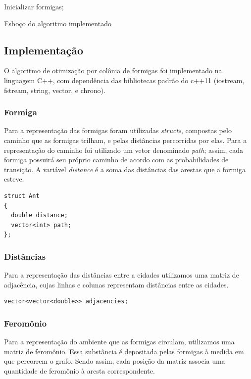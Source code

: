 \documentclass[a4paper, 12pt]{article}
\begin{document}
\begin{algorithm}[h]
\SetAlgoLined
{}

Inicializar formigas; \\
\caption{Esboço do algoritmo implementado}
\label{alg:algoritmo1}
\end{algorithm}
\setlength{\parskip}{0.0cm}


\subsection{Implementação}
O algoritmo de otimização por colônia de formigas foi implementado na linguagem C++, com dependência das bibliotecas padrão do c++11 (iostream, fstream, string, vector, e chrono). 


\subsubsection{Formiga}
Para a representação das formigas foram utilizadas \textit{structs}, compostas pelo caminho que as formigas trilham, e pelas distâncias percorridas por elas. Para a representação do caminho foi utilizado um vetor denominado \textit{path}; assim, cada formiga possuirá seu próprio caminho de acordo com as probabilidades de transição. A variável \textit{distance} é a soma das distâncias das arestas que a formiga esteve.

\begin{lstlisting}
struct Ant
{
  double distance;
  vector<int> path;
};
\end{lstlisting}

\subsubsection{Distâncias}
Para a representação das distâncias entre a cidades utilizamos uma matriz de adjacência, cujas linhas e colunas representam distâncias entre as cidades.
\begin{lstlisting}
vector<vector<double>> adjacencies;
\end{lstlisting}

\subsubsection{Feromônio}
Para a representação do ambiente que as formigas circulam, utilizamos uma matriz de feromônio. Essa substância é depositada pelas formigas à medida em que percorrem o grafo. Sendo assim, cada posição da matriz associa uma quantidade de feromônio à aresta correspondente.
\end{document}
